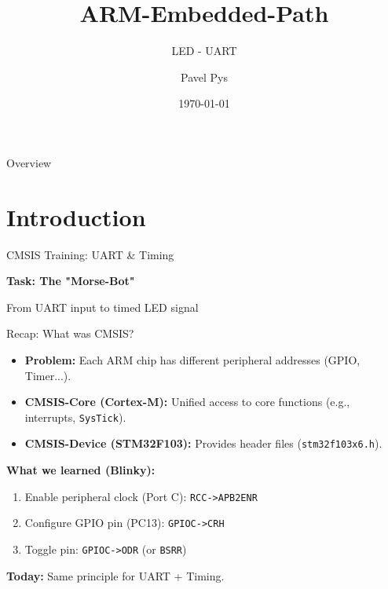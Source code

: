 \documentclass{beamer}
\title{ARM-Embedded-Path}
\subtitle{LED - UART}
\author{Pavel Pys}
\date{\today}
\begin{document}
\begin{frame}{}
	\maketitle
\end{frame}
\begin{frame}{Overview}
	\tableofcontents
\end{frame}
\section{Introduction}
\begin{frame}{CMSIS Training: UART \& Timing}
	\begin{center}
		\Large\textbf{Task: The "Morse-Bot"}
		\medskip
		
		\normalsize From UART input to timed LED signal
	\end{center}
\end{frame}
\begin{frame}{Recap: What was CMSIS?}
	\begin{itemize}
		\item \textbf{Problem:} Each ARM chip has different peripheral addresses (GPIO, Timer...).
		\item \textbf{CMSIS-Core (Cortex-M):} Unified access to core functions (e.g., interrupts, \texttt{SysTick}).
		\item \textbf{CMSIS-Device (STM32F103):} Provides header files (\texttt{stm32f103x6.h}).
	\end{itemize}
	
	\medskip
	\textbf{What we learned (Blinky):}
	\begin{enumerate}
		\item Enable peripheral clock (Port C): \texttt{RCC->APB2ENR}
		\item Configure GPIO pin (PC13): \texttt{GPIOC->CRH}
		\item Toggle pin: \texttt{GPIOC->ODR} (or \texttt{BSRR})
	\end{enumerate}
	
	\medskip
	\textbf{Today:} Same principle for UART + Timing.
\end{frame}
\end{document}
